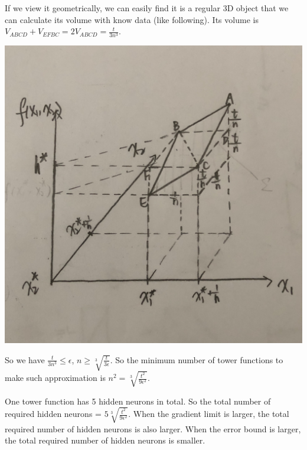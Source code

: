 \documentclass[paper=letter, fontsize=12pt]{article}
\begin{document}
\begin{enumerate}[label=(\alph*)]
	If we view it geometrically, we can easily find it is a regular 3D object that we can calculate its volume with know data (like following). Its volume is $V_{ABCD} + V_{EFBC} = 2V_{ABCD} = \frac{t}{3n^3}$.
	
	\includegraphics[scale=0.1]{q12c.png}
	
	So we have $\frac{t}{3n^3} \leq \epsilon$, $n \geq \sqrt[3]{\frac{t}{3\epsilon}}$. So the minimum number of tower functions to make such approximation is $n^2 = \sqrt[3]{\frac{t^2}{9\epsilon^2}}$.
	
	One tower function has 5 hidden neurons in total. So the total number of required hidden neurons = $5 \sqrt[3]{\frac{t^2}{9\epsilon^2}}$. When the gradient limit is larger, the total required number of hidden neurons is also larger. When the error bound is larger, the total required number of hidden neurons is smaller.
	
\end{enumerate}
\end{document}
